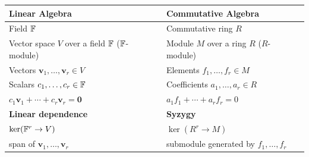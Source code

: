 \documentclass[11pt,openany]{article}
\begin{document}
\begin{center}
\begin{tabular}{>{\raggedright\arraybackslash}p{}| >{\raggedright\arraybackslash}p{}}
\toprule[1.2pt]
\textbf{Linear Algebra} & \textbf{Commutative Algebra} \\ \midrule
Field \(\mathbb{F}\) & Commutative ring \(R\) \\
\hline
Vector space \(V\) over a field \(\mathbb{F}\) ($\mathbb{F}$-module) & Module $M$ over a ring $R$ (\(R\)-module) \\
\hline
Vectors \(\mathbf{v}_1,\dots,\mathbf{v}_r\in V\) & Elements \(f_1,\dots,f_r\in M\) \\
\hline
Scalars \(c_1,\dots,c_r\in \mathbb{F}\) & Coefficients \(a_1,\dots,a_r\in R\) \\
\hline
\(c_1\mathbf{v}_1+\cdots+c_r\mathbf{v}_r=\mathbf{0}\) & \(a_1f_1+\cdots+a_rf_r=0\) \\
\hline
\cellcolor{magenta!20}\textbf{Linear dependence} & \cellcolor{magenta!20}\textbf{Syzygy} \\
\hline
\(\ker(\mathbb{F}^r\to V)\) & \(\ker(R^r\to M)\) \\
\hline
span of \(\mathbf{v}_1,\dots,\mathbf{v}_r\) & submodule generated by \(f_1,\dots,f_r\) \\
\toprule[1.2pt]
\end{tabular}
\end{center}
\end{document}

